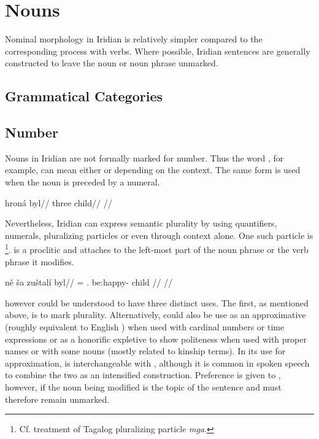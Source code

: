 \chapter{Nouns}

Nominal morphology in Iridian is relatively simpler compared to the corresponding process with verbs. Where possible, Iridian sentences are generally constructed to leave the noun or noun phrase unmarked.

\section{Grammatical Categories}

\section{Number}

Nouns in Iridian are not formally marked for number. Thus the word , for example, can mean either  or  depending on the context. The same form is used when the noun is preceded by a numeral.

\pex
\begingl
\gla hroná byl//
\glb three child//
\glft {}//
\endgl
\xe

Nevertheless, Iridian can express semantic plurality by using quantifiers, numerals, pluralizing particles or even through context alone. One such particle is \label{sec:plurals}\footnote{Cf.  treatment of Tagalog pluralizing particle \emph{mga}.}.  is a proclitic and attaches to the left-most part of the noun phrase or the verb phrase it modifies.

\pex
\begingl
    \gla n\v{e} ša zuštalí byl//
    \glb \Pl{}= \Dem{}.\Prox{} be:happy-\Att{} child //
    \glft {}//
\endgl
\xe

 however could be understood to have three distinct uses. The first, as mentioned above, is to mark plurality. Alternatively,  could also be use as an approximative (roughly equivalent to English ) when used with cardinal numbers or time expressions or as a honorific expletive to show politeness when used with proper names or with some nouns (mostly related to kinship terms). In its use for approximation,  is interchangeable with , although it is common in spoken speech to combine the two as an intensified construction. Preference is given to , however, if the noun being modified is the topic of the sentence and must therefore remain unmarked.

